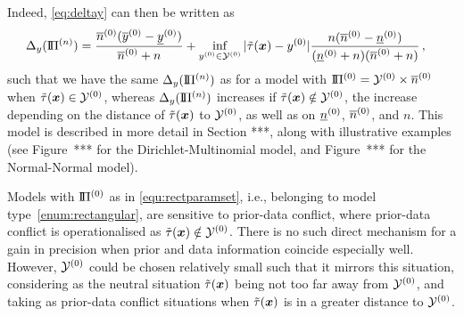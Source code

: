 Indeed, \eqref{eq:deltay} can then be written as
\begin{align*}
\Delta_y(\text{I}\!\Pi^{(n)}) &= \frac{\overline{n}^{(0)} (\overline{y}^{(0)} - \underline{y}^{(0)})}{\overline{n}^{(0)} + n} + \inf_{y^{(0)} \in \mathcal{Y}^{(0)}} |\tilde{\tau}({\bm x}) - y^{(0)}| \frac{n (\overline{n}^{(0)} - \underline{n}^{(0)})}{(\underline{n}^{(0)} + n)(\overline{n}^{(0)} + n)}\,,
\end{align*}
such that we have the same $\Delta_y(\text{I}\!\Pi^{(n)})$ as for a model with $\text{I}\!\Pi^{(0)} = \mathcal{Y}^{(0)} \times \overline{n}^{(0)}$ when $\tilde{\tau}({\bm x}) \in \mathcal{Y}^{(0)}$,
whereas $\Delta_y(\text{I}\!\Pi^{(n)})$ increases if $\tilde{\tau}({\bm x}) \notin \mathcal{Y}^{(0)}$, the increase depending on the distance of $\tilde{\tau}({\bm x})$ to $\mathcal{Y}^{(0)}$,
as well as on $\underline{n}^{(0)}$, $\overline{n}^{(0)}$, and $n$.
This model is described in more detail in Section ***, along with illustrative examples
(see Figure~*** for the Dirichlet-Multinomial model, and Figure~*** for the Normal-Normal model).


Models with $\text{I}\!\Pi^{(0)}$ as in \eqref{equ:rectparamset}, %
i.e., belonging to model type~\eqref{enum:rectangular},
are sensitive to prior-data conflict,
where prior-data conflict is operationalised as $\tilde{\tau}({\bm x}) \notin \mathcal{Y}^{(0)}$.
There is no such direct mechanism for a gain in precision when prior and data information coincide especially well.
However, $\mathcal{Y}^{(0)}$ could be chosen relatively small such that it mirrors this situation,
considering as the neutral situation $\tilde{\tau}({\bm x})$ being not too far away from $\mathcal{Y}^{(0)}$,
and taking as prior-data conflict situations when $\tilde{\tau}({\bm x})$ is in a greater distance to $\mathcal{Y}^{(0)}$.

